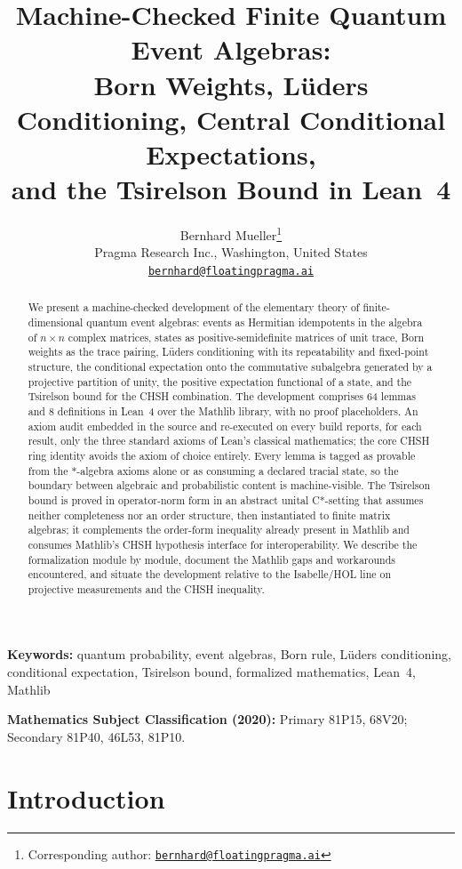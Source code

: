 \documentclass[11pt]{article}
\title{\textbf{Machine-Checked Finite Quantum Event Algebras:\\
Born Weights, L\"uders Conditioning, Central Conditional Expectations,\\
and the Tsirelson Bound in Lean~4}}
\author{Bernhard Mueller\thanks{Corresponding author:
\href{mailto:bernhard@floatingpragma.ai}{\texttt{bernhard@floatingpragma.ai}}}\\
Pragma Research Inc., Washington, United States\\
\href{mailto:bernhard@floatingpragma.ai}{\texttt{bernhard@floatingpragma.ai}}}
\date{}
\renewcommand{\_}{\textunderscore\allowbreak}
\theoremstyle{remark}
\begin{document}
\maketitle

\begin{abstract}
We present a machine-checked development of the elementary theory of finite-dimensional quantum event algebras: events as Hermitian idempotents in the algebra of $n \times n$ complex matrices, states as positive-semidefinite matrices of unit trace, Born weights as the trace pairing, L\"uders conditioning with its repeatability and fixed-point structure, the conditional expectation onto the commutative subalgebra generated by a projective partition of unity, the positive expectation functional of a state, and the Tsirelson bound for the CHSH combination. The development comprises 64 lemmas and 8 definitions in Lean~4 over the Mathlib library, with no proof placeholders. An axiom audit embedded in the source and re-executed on every build reports, for each result, only the three standard axioms of Lean's classical mathematics; the core CHSH ring identity avoids the axiom of choice entirely. Every lemma is tagged as provable from the $*$-algebra axioms alone or as consuming a declared tracial state, so the boundary between algebraic and probabilistic content is machine-visible. The Tsirelson bound is proved in operator-norm form in an abstract unital C*-setting that assumes neither completeness nor an order structure, then instantiated to finite matrix algebras; it complements the order-form inequality already present in Mathlib and consumes Mathlib's CHSH hypothesis interface for interoperability. We describe the formalization module by module, document the Mathlib gaps and workarounds encountered, and situate the development relative to the Isabelle/HOL line on projective measurements and the CHSH inequality.
\end{abstract}

\noindent\textbf{Keywords:} quantum probability, event algebras, Born rule, L\"uders conditioning, conditional expectation, Tsirelson bound, formalized mathematics, Lean~4, Mathlib

\medskip
\noindent\textbf{Mathematics Subject Classification (2020):} Primary 81P15, 68V20; Secondary 81P40, 46L53, 81P10.

\section{Introduction}
\label{sec:intro}
\end{document}
